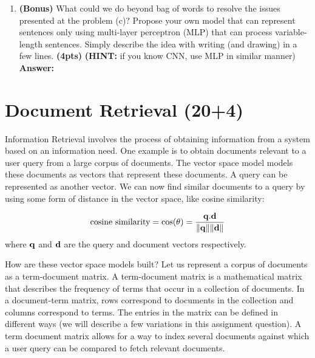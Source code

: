 \documentclass{assignment format}
\newenvironment{answer}{
    {\bf Answer:} \begingroup\color{red}
}{\endgroup}%
\begin{document}
\begin{enumerate}[label=(\alph*)]
As an example, $s_1$=``John likes to watch movies. Mary likes movies too." is closer to $s_3$=``Mary likes to watch football games." than to $s_2$=``John likes to watch films. So does mary." in the vector space. Please find a different example that satisfies the above. Once you have found your example, please give a possible explanation for why this counter-intuitive result may have happened. \textbf{(4pts)}

\begin{answer}

\end{answer}
\item \textbf{(Bonus)} What could we do beyond bag of words to resolve the issues presented at the problem (c)? Propose your own model that can represent sentences only using multi-layer perceptron (MLP) that can process variable-length sentences. Simply describe the idea with writing (and drawing) in a few lines. \textbf{(4pts)}
\newline
\textbf{(HINT:} if you know CNN, use MLP in similar manner)
\newline
\begin{answer}

\end{answer}
\end{enumerate}

\section{Document Retrieval (20+4)}
Information Retrieval involves the process of obtaining information from a system based on an information need. 
One example is to obtain documents relevant to a user query from a large corpus of documents. 
The vector space model models these documents as vectors that represent these documents. 
A query can be represented as another vector. 
We can now find similar documents to a query by using some form of distance in the vector space, like cosine similarity:

\begin{align*}
    \text{cosine similarity} = \text{cos}(\theta) = \frac{{\bf q}.{\bf d}}{\lVert {\bf q} \rVert \lVert {\bf d} \rVert }
\end{align*}
where ${\bf q}$ and ${\bf d}$ are the query and document vectors respectively. 

How are these vector space models built?
Let us represent a corpus of documents as a term-document matrix.
A term-document matrix is a mathematical matrix that describes the frequency of terms that occur in a collection of documents. In a document-term matrix, rows correspond to documents in the collection and columns correspond to terms. The entries in the matrix can be defined in different ways (we will describe a few variations in this assignment question).
A term document matrix allows for a way to index several documents against which a user query can be compared to fetch relevant documents.
\end{document}
